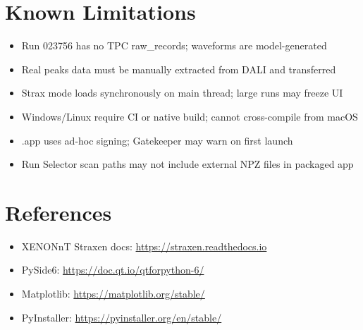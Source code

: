 \documentclass[12pt,a4paper]{article}
\begin{document}
\section{Known Limitations}
\begin{itemize}[itemsep=2pt]
\item Run 023756 has no TPC raw\_records; waveforms are model-generated
\item Real peaks data must be manually extracted from DALI and transferred
\item Strax mode loads synchronously on main thread; large runs may freeze UI
\item Windows/Linux require CI or native build; cannot cross-compile from macOS
\item .app uses ad-hoc signing; Gatekeeper may warn on first launch
\item Run Selector scan paths may not include external NPZ files in packaged app
\end{itemize}

\section{References}
\begin{itemize}[itemsep=2pt]
\item XENONnT Straxen docs: \url{https://straxen.readthedocs.io}
\item PySide6: \url{https://doc.qt.io/qtforpython-6/}
\item Matplotlib: \url{https://matplotlib.org/stable/}
\item PyInstaller: \url{https://pyinstaller.org/en/stable/}
\end{itemize}
\end{document}
